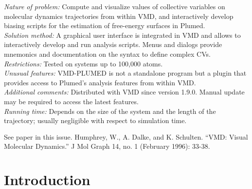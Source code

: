 \documentclass[preprint,12pt]{elsarticle}
\begin{document}
\begin{small}
  {\em Nature of problem:} Compute and visualize values of collective
  variables on molecular dynamics trajectories from within VMD, and
  interactively develop biasing scripts for the estimation of
  free-energy surfaces in Plumed.
  \\
  {\em Solution method:} A graphical user interface is integrated in
  VMD and allows to interactively develop and run analysis scripts.
  Menus and dialogs provide mnemonics and documentation on the syntax
  to define complex CVs.
  \\
  {\em Restrictions:}
  Tested on systems up to 100,000 atoms. \\
  {\em Unusual features:} VMD-PLUMED is not a standalone program but a
  plugin that provides access to Plumed's analysis features from within VMD. \\
  {\em Additional comments:} Distributed with VMD since version 1.9.0.
  Manual  update may be required  to access the latest features.   \\
  {\em Running time:} Depends on the size of the system and the length
  of the trajectory; usually negligible with respect to simulation time.  \\
\begin{thebibliography}{0}
See paper in this issue.
Humphrey, W., A. Dalke, and K. Schulten. ``VMD: Visual
  Molecular Dynamics.'' J Mol Graph 14, no. 1 (February 1996): 33-38.
\end{thebibliography}

\end{small}



\section{Introduction}
\end{document}
